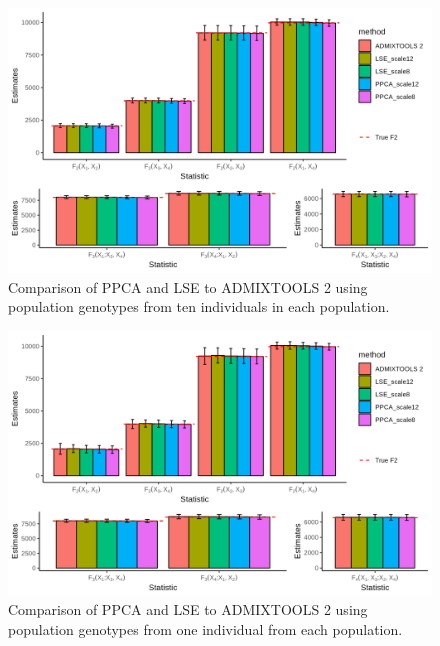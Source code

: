 \documentclass[12pt, letterpaper]{article}
\begin{document}
\begin{figure}[ht!]
    \includegraphics[width=16.5cm]{plots/simfiles/Ne1000/split_times1000/npop10_nind100/plots_8_12/mu0.05_plot_all.png}
    \centering
    \caption{Comparison of PPCA and LSE to ADMIXTOOLS 2 using population genotypes from ten individuals in each population.}
    \label{figS2:pc_scale}
\end{figure}

\begin{figure}[ht!]
    \includegraphics[width=16.5cm]{plots/simfiles/Ne1000/split_times1000/npop10_nind100/plots_8_12/mu0.05_plot_all_1ind.png}
    \centering
    \caption{Comparison of PPCA and LSE to ADMIXTOOLS 2 using population genotypes from one individual from each population.}
    \label{figS2:pc_scale}
\end{figure}
\end{document}
